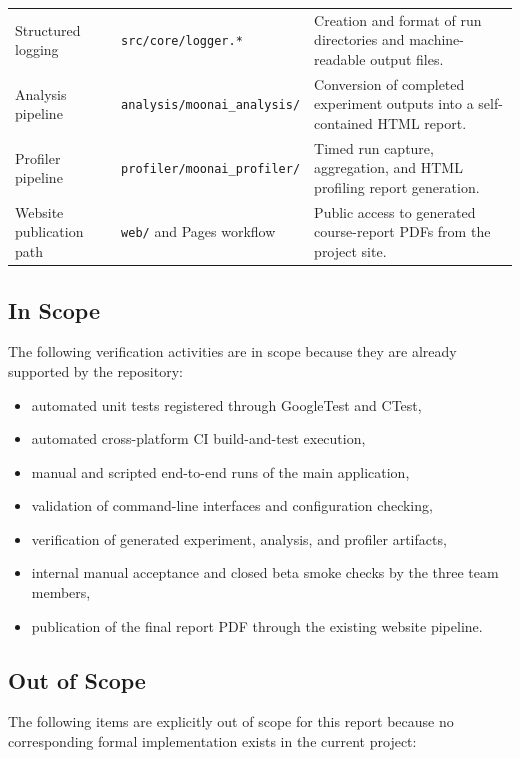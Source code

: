 \begin{table}[H]
\begin{tabularx}{\textwidth}{@{}>{\ttfamily\small}l>{\ttfamily\small}lX@{}}
		Structured logging         & \texttt{src/core/logger.*}          & Creation and format of run directories and machine-readable output files.                            \\
		Analysis pipeline          & \texttt{analysis/moonai\_analysis/} & Conversion of completed experiment outputs into a self-contained HTML report.                        \\
		Profiler pipeline          & \texttt{profiler/moonai\_profiler/} & Timed run capture, aggregation, and HTML profiling report generation.                                \\
		Website publication path   & \texttt{web/} and Pages workflow    & Public access to generated course-report PDFs from the project site.                                 \\
		\bottomrule
	\end{tabularx}
\end{table}

\subsection{In Scope}

The following verification activities are in scope because they are already supported by the
repository:

\begin{itemize}[nosep]
	\item automated unit tests registered through GoogleTest and CTest,
	\item automated cross-platform CI build-and-test execution,
	\item manual and scripted end-to-end runs of the main application,
	\item validation of command-line interfaces and configuration checking,
	\item verification of generated experiment, analysis, and profiler artifacts,
	\item internal manual acceptance and closed beta smoke checks by the three team members,
	\item publication of the final report PDF through the existing website pipeline.
\end{itemize}

\subsection{Out of Scope}

The following items are explicitly out of scope for this report because no corresponding
formal implementation exists in the current project:

